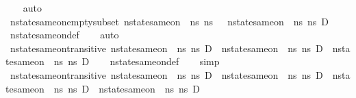 \begin{isabellebody}
\ \ \isamarkupfalse%
\ auto%
\endisatagproof
{\isafoldproof}%
%
\isadelimproof
\isanewline
%
\endisadelimproof
\isanewline
{}\isamarkupfalse%
\ nstate{\isacharunderscore}{\kern0pt}same{\isacharunderscore}{\kern0pt}on{\isacharunderscore}{\kern0pt}empty{\isacharunderscore}{\kern0pt}subset{\isacharcolon}{\kern0pt}\ {\isachardoublequoteopen}nstate{\isacharunderscore}{\kern0pt}same{\isacharunderscore}{\kern0pt}on\ {\isasymLambda}\ ns{}\ ns{}\ {\isacharbraceleft}{\kern0pt}{\isacharbraceright}{\kern0pt}\ {\isasymLongrightarrow}\ nstate{\isacharunderscore}{\kern0pt}same{\isacharunderscore}{\kern0pt}on\ {\isasymLambda}\ ns{}\ ns{}\ D{\isachardoublequoteclose}\isanewline
%
\isadelimproof
\ \ %
\endisadelimproof
%
\isatagproof
{}\isamarkupfalse%
\ nstate{\isacharunderscore}{\kern0pt}same{\isacharunderscore}{\kern0pt}on{\isacharunderscore}{\kern0pt}def\isanewline
\ \ \isamarkupfalse%
\ auto%
\endisatagproof
{\isafoldproof}%
%
\isadelimproof
\isanewline
%
\endisadelimproof
\isanewline
{}\isamarkupfalse%
\ nstate{\isacharunderscore}{\kern0pt}same{\isacharunderscore}{\kern0pt}on{\isacharunderscore}{\kern0pt}transitive{\isacharcolon}{\kern0pt}\ {\isachardoublequoteopen}nstate{\isacharunderscore}{\kern0pt}same{\isacharunderscore}{\kern0pt}on\ {\isasymLambda}\ ns{}\ ns{}\ D\ {\isasymLongrightarrow}\ nstate{\isacharunderscore}{\kern0pt}same{\isacharunderscore}{\kern0pt}on\ {\isasymLambda}\ ns{}\ ns{}\ D\ {\isasymLongrightarrow}\ nstate{\isacharunderscore}{\kern0pt}same{\isacharunderscore}{\kern0pt}on\ {\isasymLambda}\ ns{}\ ns{}\ D{\isachardoublequoteclose}\isanewline
%
\isadelimproof
\ \ %
\endisadelimproof
%
\isatagproof
{}\isamarkupfalse%
\ nstate{\isacharunderscore}{\kern0pt}same{\isacharunderscore}{\kern0pt}on{\isacharunderscore}{\kern0pt}def\isanewline
\ \ \isamarkupfalse%
\ simp%
\endisatagproof
{\isafoldproof}%
%
\isadelimproof
\isanewline
%
\endisadelimproof
\isanewline
{}\isamarkupfalse%
\ nstate{\isacharunderscore}{\kern0pt}same{\isacharunderscore}{\kern0pt}on{\isacharunderscore}{\kern0pt}transitive{\isacharunderscore}{\kern0pt}{}{\isacharcolon}{\kern0pt}\ {\isachardoublequoteopen}nstate{\isacharunderscore}{\kern0pt}same{\isacharunderscore}{\kern0pt}on\ {\isasymLambda}\ ns{}\ ns{}\ D\ {\isasymLongrightarrow}\ nstate{\isacharunderscore}{\kern0pt}same{\isacharunderscore}{\kern0pt}on\ {\isasymLambda}\ ns{}\ ns{}\ D\ {\isasymLongrightarrow}\ nstate{\isacharunderscore}{\kern0pt}same{\isacharunderscore}{\kern0pt}on\ {\isasymLambda}\ ns{}\ ns{}\ D\ {\isasymLongrightarrow}\ nstate{\isacharunderscore}{\kern0pt}same{\isacharunderscore}{\kern0pt}on\ {\isasymLambda}\ ns{}\ ns{}\ D{\isachardoublequoteclose}\isanewline

\end{isabellebody}
